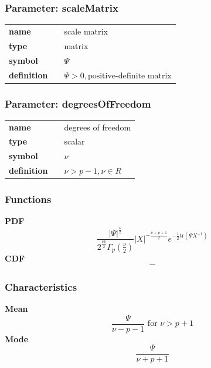 \subsubsection*{Parameter: scaleMatrix}

\noindent\begin{tabular}{p{2cm}cl}
\textbf{name} & & scale matrix \\
\textbf{type} & & matrix \\
\textbf{symbol} & & $\Psi$  \\
\textbf{definition} & & $\Psi > 0, \text{positive-definite matrix}$
\end{tabular}
\subsubsection*{Parameter: degreesOfFreedom}

\noindent\begin{tabular}{p{2cm}cl}
\textbf{name} & & degrees of freedom \\
\textbf{type} & & scalar \\
\textbf{symbol} & & $\nu$  \\
\textbf{definition} & & $\nu > p-1, \nu \in  R$
\end{tabular}
\subsubsection*{Functions}

\smallskip \noindent \hspace{.2cm} \textbf{PDF} 
\begin{equation*}\frac{\left|\Psi\right|^{\frac{\nu}{2}}}{2^{\frac{\nu p}{2}}\Gamma_p(\frac{\nu}{2})} \left|X\right|^{-\frac{\nu+p+1}{2}}e^{-\frac{1}{2}\text{tr}(\Psi X^{-1})}\end{equation*}
\smallskip \noindent \hspace{.2cm} \textbf{CDF} 
\begin{equation*}-\end{equation*}
\smallskip
\subsubsection*{Characteristics}
\smallskip \noindent \hspace{.2cm} \textbf{Mean} 
\begin{equation*}\frac{\Psi}{\nu - p - 1} \text{ for }\nu > p + 1\end{equation*}
\smallskip \noindent \hspace{.2cm} \textbf{Mode} 
\begin{equation*}\frac{\Psi}{\nu + p + 1}\end{equation*}
\smallskip
